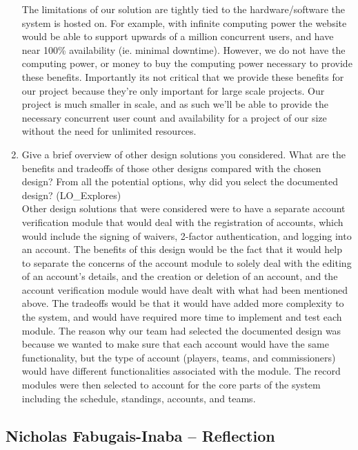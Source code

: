 \documentclass[12pt, titlepage]{article}
\begin{document}
\begin{enumerate}
    The limitations of our solution are tightly tied to the hardware/software 
    the system is hosted on. For example, with infinite computing power the 
    website would be able to support upwards of a million concurrent users, 
    and have near 100\% availability (ie. minimal downtime). However, we do not
    have the computing power, or money to buy the computing power necessary to
    provide these benefits. Importantly its not critical that we provide these
    benefits for our project because they're only important for large scale
    projects. Our project is much smaller in scale, and as such we'll be able 
    to provide the necessary concurrent user count and availability for a 
    project of our size without the need for unlimited resources.
    
    \item Give a brief overview of other design solutions you considered. What
    are the benefits and tradeoffs of those other designs compared with the chosen
    design?  From all the potential options, why did you select the documented design?
    (LO\_Explores)\\

    Other design solutions that were considered were to have a separate account verification module
    that would deal with the registration of accounts, which would include the signing of waivers,
    2-factor authentication, and logging into an account. The benefits of this design would be the
    fact that it would help to separate the concerns of the account module to solely deal with the
    editing of an account's details, and the creation or deletion of an account, and the account
    verification module would have dealt with what had been mentioned above. The tradeoffs would
    be that it would have added more complexity to the system, and would have required more time
    to implement and test each module. The reason why our team had selected the documented design
    was because we wanted to make sure that each account would have the same functionality, but
    the type of account (players, teams, and commissioners) would have different functionalities
    associated with the module. The record modules were then selected to account for the
    core parts of the system including the schedule, standings, accounts, and teams.

\end{enumerate}

\subsection*{Nicholas Fabugais-Inaba -- Reflection}
\end{document}
